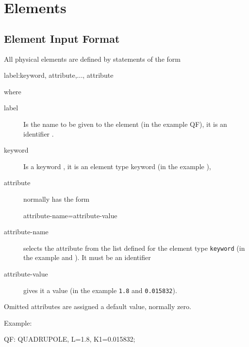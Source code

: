 

\chapter{Elements}
\label{chp:element}

\section{Element Input Format}
\label{sec:elm-format}
All physical elements are defined by statements of the form
\begin{example}
label:keyword, attribute,..., attribute
\end{example}
where
\begin{description}

\item[label]
   \Newline
  Is the name to be given to the element (in the example QF),
  it is an {identifier} .

\item[keyword] \Newline
  Is a {keyword} ,
  it is an element type keyword (in the example ),
\item[attribute]  \Newline
  normally has the form
\begin{example}
attribute-name=attribute-value
\end{example}
\item[attribute-name]  \Newline
  selects the attribute from the list defined for the element type
  \texttt{keyword} (in the example  and ).
  It must be an {identifier} 
\item[attribute-value] \Newline
  gives it a {value} 
  (in the example \texttt{1.8} and \texttt{0.015832}).
\end{description}
Omitted attributes are assigned a default value, normally zero.

\noindent Example:
\begin{example}
QF: QUADRUPOLE, L=1.8, K1=0.015832;
\end{example}




